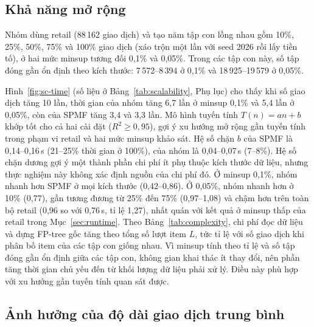 \subsection{Khả năng mở rộng}
\label{sec:scalability}

Nhóm dùng retail (88\,162 giao dịch) và tạo năm tập con lồng nhau gồm 10\%, 25\%, 50\%, 75\% và 100\% giao dịch (xáo
trộn một lần với seed 2026 rồi lấy tiền tố), ở hai mức minsup tương đối 0{,}1\% và 0{,}05\%. Trong các tập con
này, số tập đóng gần ổn định theo kích thước: 7\,572–8\,394 ở 0{,}1\% và 18\,925–19\,579 ở 0{,}05\%.


Hình~\ref{fig:sc-time} (số liệu ở Bảng~\ref{tab:scalability}, Phụ lục) cho thấy khi số giao dịch tăng 10 lần, thời
gian của nhóm tăng 6{,}7 lần ở minsup 0{,}1\% và 5{,}4 lần ở 0{,}05\%, còn của SPMF tăng 3{,}4 và 3{,}3 lần. Mô hình
tuyến tính $T(n)=an+b$ khớp tốt cho cả hai cài đặt ($R^2 \geq 0{,}95$), gợi ý xu hướng mở rộng gần tuyến tính trong
phạm vi retail và hai mức minsup khảo sát. Hệ số chặn $b$ của SPMF là 0{,}14–0{,}16\,s (21–25\% thời gian ở 100\%),
của nhóm là 0{,}04–0{,}07\,s (7–8\%). Hệ số chặn dương gợi ý một thành phần chi phí ít phụ thuộc kích thước dữ liệu,
nhưng thực nghiệm này không xác định nguồn của chi phí đó. Ở minsup 0{,}1\%, nhóm nhanh hơn SPMF ở mọi kích thước
(0{,}42–0{,}86). Ở 0{,}05\%, nhóm nhanh hơn ở 10\% (0{,}77), gần tương đương từ 25\% đến 75\% (0{,}97–1{,}08) và chậm
hơn trên toàn bộ retail (0{,}96 so với 0{,}76\,s, tỉ lệ 1{,}27), nhất quán với kết quả ở minsup thấp của retail trong
Mục~\ref{sec:runtime}. Theo Bảng~\ref{tab:complexity}, chi phí đọc dữ liệu và dựng FP-tree gốc tăng theo tổng số lượt
item $L$, tức tỉ lệ với số giao dịch khi phân bố item của các tập con giống nhau. Vì minsup tính theo tỉ lệ và số tập
đóng gần ổn định giữa các tập con, không gian khai thác ít thay đổi, nên phần tăng thời gian chủ yếu đến từ khối lượng
dữ liệu phải xử lý. Điều này phù hợp với xu hướng gần tuyến tính quan sát được.

\subsection{Ảnh hưởng của độ dài giao dịch trung bình}
\label{sec:txlen}

